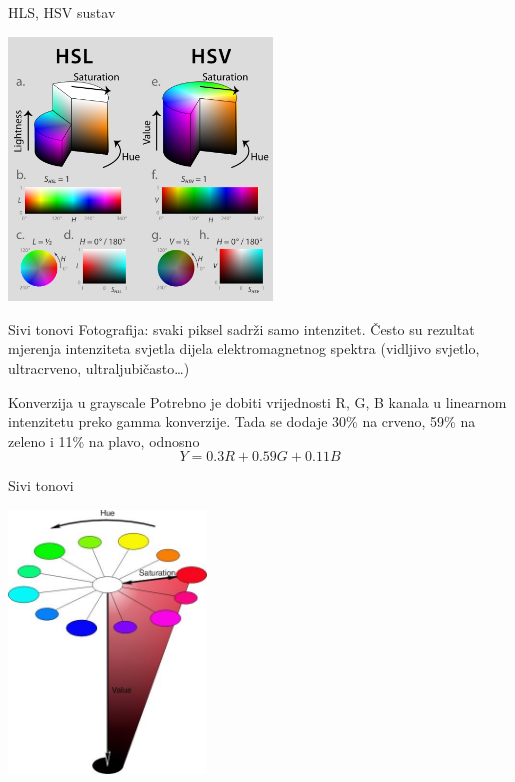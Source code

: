 \documentclass[9pt]{beamer}
\begin{document}
\begin{frame}{HLS, HSV sustav}
	\begin{center}
		\includegraphics[height=7cm]{slike/04_hsl-hsv_models.png}
	\end{center}
\end{frame}

\begin{frame}{Sivi tonovi}
	Fotografija: svaki piksel sadrži samo intenzitet. Često su rezultat mjerenja intenziteta svjetla  dijela elektromagnetnog spektra 
	(vidljivo svjetlo, ultracrveno, ultraljubičasto\ldots)
	\begin{block}{Konverzija u grayscale}
		Potrebno je dobiti vrijednosti R, G, B kanala u linearnom intenzitetu preko gamma konverzije. Tada se dodaje 30\% na crveno, 
		59\% na zeleno i 11\% na plavo, odnosno \[Y = 0.3R + 0.59G + 0.11B\]
	\end{block}
\end{frame}

\begin{frame}{Sivi tonovi}
	\begin{center}
		\includegraphics[height=7cm]{slike/07_hexacone-5.png}
	\end{center}
\end{frame}
\end{document}
